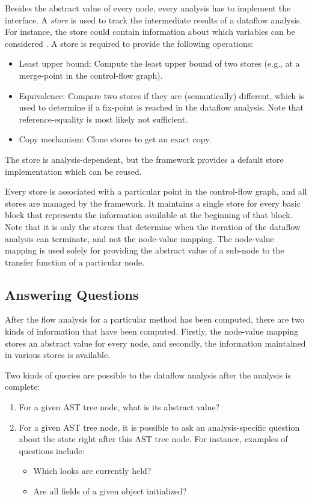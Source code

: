 Besides the abstract value of every node,
every analysis has to implement the  interface. A \emph{store} is
used to track the intermediate results of a dataflow analysis. For instance, the store
could contain information about which variables can be considered .
A store is required to provide the following operations:
\begin{itemize}
\item Least upper bound: Compute the least upper bound of two stores (e.g., at a merge-point
in the control-flow graph).
\item Equivalence: Compare two stores if they are (semantically) different, which is used
to determine if a fix-point is reached in the dataflow analysis. Note that reference-equality
is most likely not sufficient.
\item Copy mechanism: Clone stores to get an exact copy.
\end{itemize}
The store is analysis-dependent, but the framework provides a default store implementation
which can be reused.

Every store is associated with a particular point in the control-flow graph, and
all stores are managed by the framework. It maintains
a single store for every basic block that represents the information available at the
beginning of that block.
Note that it is only the stores that determine when the iteration of the dataflow analysis
can terminate, and not the node-value mapping.  The node-value mapping is used solely for
providing the abstract value of a sub-node to the transfer function of a particular node.


\subsection{Answering Questions}
After the flow analysis for a particular method has been computed, there are two kinds of
information that have been computed.  Firstly, the node-value mapping stores an abstract
value for every node, and secondly, the information maintained in various stores is
available.

Two kinds of queries are possible to the dataflow analysis after the analysis is complete:
\begin{enumerate}
    \item For a given AST tree node, what is its abstract value?
    \item For a given AST tree node, it is possible to ask an analysis-specific question
    about the state right after this AST tree node. For instance, examples of questions
    include:
    \begin{itemize}
        \item Which looks are currently held?
        \item Are all fields of a given object initialized?
    \end{itemize}
\end{enumerate}

